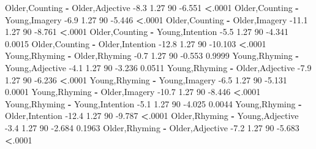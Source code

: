 \documentclass[]{article}
\newenvironment{Shaded}{\begin{snugshade}}{\end{snugshade}}
\newcommand{\DecValTok}[1]{\textcolor[rgb]{0.00,0.00,0.81}{#1}}
\newcommand{\FloatTok}[1]{\textcolor[rgb]{0.00,0.00,0.81}{#1}}
\newcommand{\NormalTok}[1]{#1}
\newcommand{\OperatorTok}[1]{\textcolor[rgb]{0.81,0.36,0.00}{\textbf{#1}}}
\newcommand{\StringTok}[1]{\textcolor[rgb]{0.31,0.60,0.02}{#1}}
\begin{document}
\begin{Shaded}
\begin{Highlighting}[]
\NormalTok{ Older,Counting }\OperatorTok{-}\StringTok{ }\NormalTok{Older,Adjective      }\FloatTok{-8.3} \FloatTok{1.27} \DecValTok{90}  \FloatTok{-6.551} \OperatorTok{<}\NormalTok{.}\DecValTok{0001} 
\NormalTok{ Older,Counting }\OperatorTok{-}\StringTok{ }\NormalTok{Young,Imagery        }\FloatTok{-6.9} \FloatTok{1.27} \DecValTok{90}  \FloatTok{-5.446} \OperatorTok{<}\NormalTok{.}\DecValTok{0001} 
\NormalTok{ Older,Counting }\OperatorTok{-}\StringTok{ }\NormalTok{Older,Imagery       }\FloatTok{-11.1} \FloatTok{1.27} \DecValTok{90}  \FloatTok{-8.761} \OperatorTok{<}\NormalTok{.}\DecValTok{0001} 
\NormalTok{ Older,Counting }\OperatorTok{-}\StringTok{ }\NormalTok{Young,Intention      }\FloatTok{-5.5} \FloatTok{1.27} \DecValTok{90}  \FloatTok{-4.341} \FloatTok{0.0015} 
\NormalTok{ Older,Counting }\OperatorTok{-}\StringTok{ }\NormalTok{Older,Intention     }\FloatTok{-12.8} \FloatTok{1.27} \DecValTok{90} \FloatTok{-10.103} \OperatorTok{<}\NormalTok{.}\DecValTok{0001} 
\NormalTok{ Young,Rhyming }\OperatorTok{-}\StringTok{ }\NormalTok{Older,Rhyming         }\FloatTok{-0.7} \FloatTok{1.27} \DecValTok{90}  \FloatTok{-0.553} \FloatTok{0.9999} 
\NormalTok{ Young,Rhyming }\OperatorTok{-}\StringTok{ }\NormalTok{Young,Adjective       }\FloatTok{-4.1} \FloatTok{1.27} \DecValTok{90}  \FloatTok{-3.236} \FloatTok{0.0511} 
\NormalTok{ Young,Rhyming }\OperatorTok{-}\StringTok{ }\NormalTok{Older,Adjective       }\FloatTok{-7.9} \FloatTok{1.27} \DecValTok{90}  \FloatTok{-6.236} \OperatorTok{<}\NormalTok{.}\DecValTok{0001} 
\NormalTok{ Young,Rhyming }\OperatorTok{-}\StringTok{ }\NormalTok{Young,Imagery         }\FloatTok{-6.5} \FloatTok{1.27} \DecValTok{90}  \FloatTok{-5.131} \FloatTok{0.0001} 
\NormalTok{ Young,Rhyming }\OperatorTok{-}\StringTok{ }\NormalTok{Older,Imagery        }\FloatTok{-10.7} \FloatTok{1.27} \DecValTok{90}  \FloatTok{-8.446} \OperatorTok{<}\NormalTok{.}\DecValTok{0001} 
\NormalTok{ Young,Rhyming }\OperatorTok{-}\StringTok{ }\NormalTok{Young,Intention       }\FloatTok{-5.1} \FloatTok{1.27} \DecValTok{90}  \FloatTok{-4.025} \FloatTok{0.0044} 
\NormalTok{ Young,Rhyming }\OperatorTok{-}\StringTok{ }\NormalTok{Older,Intention      }\FloatTok{-12.4} \FloatTok{1.27} \DecValTok{90}  \FloatTok{-9.787} \OperatorTok{<}\NormalTok{.}\DecValTok{0001} 
\NormalTok{ Older,Rhyming }\OperatorTok{-}\StringTok{ }\NormalTok{Young,Adjective       }\FloatTok{-3.4} \FloatTok{1.27} \DecValTok{90}  \FloatTok{-2.684} \FloatTok{0.1963} 
\NormalTok{ Older,Rhyming }\OperatorTok{-}\StringTok{ }\NormalTok{Older,Adjective       }\FloatTok{-7.2} \FloatTok{1.27} \DecValTok{90}  \FloatTok{-5.683} \OperatorTok{<}\NormalTok{.}\DecValTok{0001} 

\end{Highlighting}
\end{Shaded}
\end{document}
